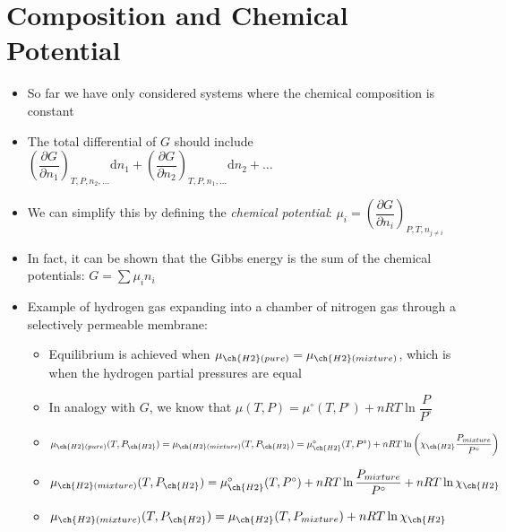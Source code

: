\documentclass[12pt, openany, letterpaper]{memoir}
\begin{document}
\section*{Composition and Chemical Potential}
\begin{itemize}
	\item So far we have only considered systems where the chemical composition is constant
	\item The total differential of $G$ should include $\left(\dfrac{\partial G}{\partial n_1}\right)_{T,P,n_2,\ldots}\!\mathrm{d}n_1 + \left(\dfrac{\partial G}{\partial n_2}\right)_{T,P,n_1,\ldots}\!\mathrm{d}n_2 + \ldots$
	\item We can simplify this by defining the \emph{chemical potential}: $\mu_i=\left(\dfrac{\partial G}{\partial n_i}\right)_{P,T,n_{j\neq i}}$
	\item In fact, it can be shown that the Gibbs energy is the sum of the chemical potentials: $G=\sum \mu_in_i$
	\item Example of hydrogen gas expanding into a chamber of nitrogen gas through a selectively permeable membrane:
	\begin{itemize}
		\item Equilibrium is achieved when $\mu_{\ch{H2}(pure)}=\mu_{\ch{H2}(mixture)}$, which is when the hydrogen partial pressures are equal
		\item In analogy with $G$, we know that $\mu(T,P) = \mu^\circ(T,P^\circ) + nRT\ln\dfrac{P}{P^\circ}$
		\item $\mu_{\ch{H2}(pure)}(T,P_{\ch{H2}})=\mu_{\ch{H2}(mixture)}(T,P_{\ch{H2}})= \mu^\circ_{\ch{H2}}(T,P^\circ)+nRT\ln\left(\chi_{\ch{H2}}\dfrac{P_{mixture}}{P^\circ}\right)$
		\item $\mu_{\ch{H2}(mixture)}(T,P_{\ch{H2}})= \mu^\circ_{\ch{H2}}(T,P^\circ)+nRT\ln\dfrac{P_{mixture}}{P^\circ} + nRT\ln\chi_{\ch{H2}}$
		\item $\mu_{\ch{H2}(mixture)}(T,P_{\ch{H2}})= \mu_{\ch{H2}}(T,P_{mixture}) + nRT\ln\chi_{\ch{H2}}$
	\end{itemize}
\end{itemize}
\end{document}
